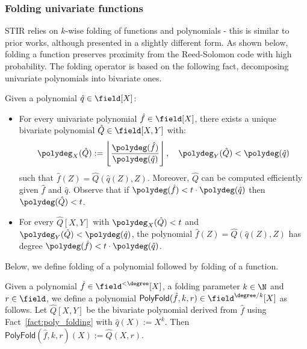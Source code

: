 \subsubsection{Folding univariate functions}\label{sec:folding_uf}
STIR relies on $k$-wise folding of functions and polynomials - this is similar to prior works, although presented in a slightly different form. As shown below, folding a function preserves proximity from the Reed-Solomon code with high probability. The folding operator is based on the following fact, decomposing univariate polynomials into bivariate ones.

\begin{lemma}\label{fact:poly_folding}
Given a polynomial $\hat{q}\in\field[X]$:
\begin{itemize}
        \item For every univariate polynomial $\hat{f}\in\field[X]$, there exists a unique bivariate polynomial $\hat{Q}\in\field[X,Y]$ with:
        \[
          \polydeg_X(\hat{Q}) := \left\lfloor \frac{\polydeg(\hat{f})}{\polydeg(\hat{q})} \right\rfloor,\quad \polydeg_Y(\hat{Q}) < \polydeg(\hat{q})
        \]
        such that $\hat{f}(Z)=\hat{Q}(\hat{q}(Z),Z)$. Moreover, $\hat{Q}$ can be computed efficiently given $\hat{f}$ and $\hat{q}$. Observe that if $\polydeg(\hat{f})<t\cdot\polydeg(\hat{q})$ then
        $\polydeg(\hat{Q})<t$.

        \item For every $\hat{Q}[X,Y]$ with $\polydeg_X(\hat{Q})<t$ and $\polydeg_Y(\hat{Q})<\polydeg(\hat{q})$, the polynomial $\hat{f}(Z)=\hat{Q}(\hat{q}(Z),Z)$ has degree $\polydeg(\hat{f})<t\cdot\polydeg(\hat{q})$.
\end{itemize}
\end{lemma}

Below, we define folding of a polynomial followed by folding of a function.
\begin{definition}\label{def:poly_folding}
    Given a polynomial $\hat{f}\in\field^{<\degree}[X]$, a folding parameter $k\in\N$ and $r\in\field$, we define a polynomial $\mathsf{PolyFold}(\hat{f},k,r)\in\field^{\degree/k}[X]$ as follows. Let $\hat{Q}[X,Y]$ be the bivariate polynomial derived from $\hat{f}$ using Fact~\ref{fact:poly_folding} with $\hat{q}(X):=X^k$. Then $\mathsf{PolyFold}(\hat{f},k,r)(X):=\hat{Q}(X,r)$.
\end{definition}

